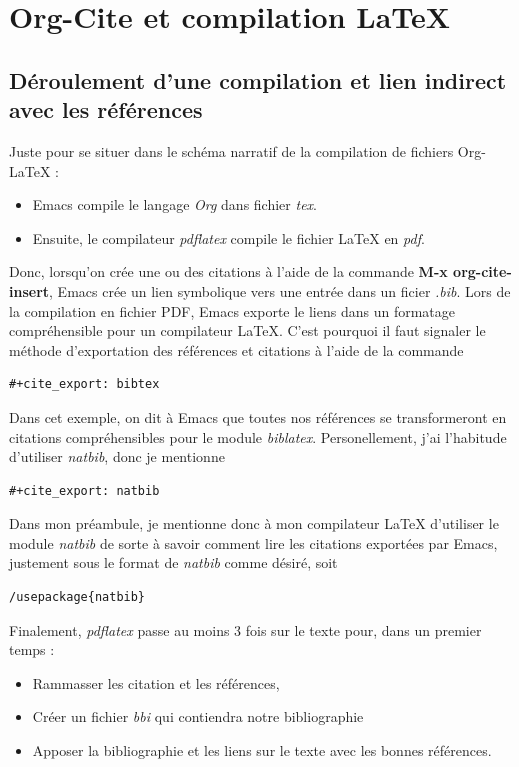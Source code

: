 \documentclass[8pt]{article}
\numberwithin{equation}{section}
\begin{document}
\section{Org-Cite et compilation \LaTeX{}}
\label{sec:orgdb0b60e}
\subsection{Déroulement d'une compilation et lien indirect avec les références}
\label{sec:orga6f3bf2}
Juste pour se situer dans le schéma narratif de la compilation de fichiers Org-\LaTeX{} :

\begin{itemize}
\item Emacs compile le langage \emph{Org} dans fichier \emph{tex}.
\item Ensuite, le compilateur \emph{pdflatex} compile le fichier \LaTeX{} en \emph{pdf}.
\end{itemize}

Donc, lorsqu'on crée une ou des citations à l'aide de la commande \textbf{M-x org-cite-insert}, Emacs crée un lien symbolique vers une entrée dans un ficier \emph{.bib}.
Lors de la compilation en fichier PDF, Emacs exporte le liens dans un formatage compréhensible pour un compilateur \LaTeX{}.
C'est pourquoi il faut signaler le méthode d'exportation des références et citations à l'aide de la commande
\begin{verbatim}
#+cite_export: bibtex
\end{verbatim}
Dans cet exemple, on dit à Emacs que toutes nos références se transformeront en citations compréhensibles pour le module \emph{biblatex}.
Personellement, j'ai l'habitude d'utiliser \emph{natbib}, donc je mentionne
\begin{verbatim}
#+cite_export: natbib
\end{verbatim}
Dans mon préambule, je mentionne donc à mon compilateur \LaTeX{} d'utiliser le module \emph{natbib} de sorte à savoir comment lire les citations exportées par Emacs, justement sous le format de \emph{natbib} comme désiré, soit
\begin{verbatim}
/usepackage{natbib}
\end{verbatim}

Finalement, \emph{pdflatex} passe au moins 3 fois sur le texte pour, dans un premier temps :
\begin{itemize}
\item Rammasser les citation et les références,
\item Créer un fichier \emph{bbi} qui contiendra notre bibliographie
\item Apposer la bibliographie et les liens sur le texte avec les bonnes références.
\end{itemize}
\end{document}
